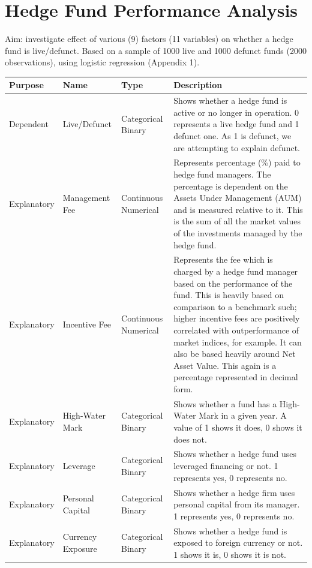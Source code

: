 \documentclass[11pt, english]{article}
\begin{document}
\newpage

\section{Hedge Fund Performance Analysis}

	Aim: investigate effect of various (9) factors (11 variables) on whether a hedge fund is live/defunct. Based on a sample of 1000 live and 1000 defunct funds (2000 observations), using logistic regression (Appendix 1).

	\begin{center}
		\scriptsize
	\begin{longtable}{p{2cm}p{3cm}p{3cm}p{5cm}}
		\textbf{Purpose} & \textbf{Name} & \textbf{Type} & \textbf{Description}	\\
		\hline
		Dependent & Live/Defunct & Categorical Binary & \tiny Shows whether a hedge fund is active or no longer in operation. 0 represents a live hedge fund and 1 defunct one. As 1 is defunct, we are attempting to explain defunct.\\
		Explanatory & Management Fee & Continuous Numerical & \tiny Represents percentage (\%) paid to hedge fund managers. The percentage is dependent on the Assets Under Management (AUM) and is measured relative to it. This is the sum of all the market values of the investments managed by the hedge fund.\\
		Explanatory & Incentive Fee & Continuous Numerical & \tiny Represents the fee which is charged by a hedge fund manager based on the performance of the fund. This is heavily based on comparison to a benchmark such; higher incentive fees are positively correlated with outperformance of market indices, for example. It can also be based heavily around Net Asset Value. This again is a percentage represented in decimal form.\\
		Explanatory & High-Water Mark & Categorical Binary & \tiny Shows whether a fund has a High-Water Mark in a given year. A value of 1 shows it does, 0 shows it does not.\\
		Explanatory & Leverage & Categorical Binary & \tiny Shows whether a hedge fund uses leveraged financing or not. 1 represents yes, 0 represents no.\\
		Explanatory & Personal Capital & Categorical Binary & \tiny Shows whether a hedge firm uses personal capital from its manager. 1 represents yes, 0 represents no.\\
		Explanatory & Currency Exposure & Categorical Binary & \tiny Shows whether a hedge fund is exposed to foreign currency or not. 1 shows it is, 0 shows it is not.\\

\end{longtable}
\end{center}
\end{document}
